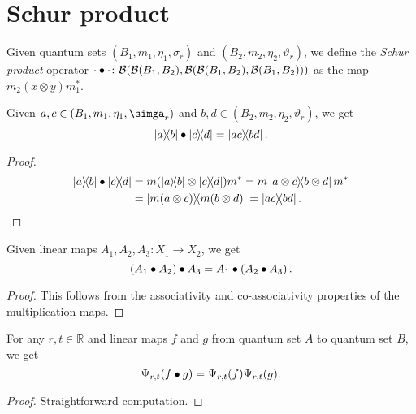 \chapter{Schur product}

 \begin{definition}\label{schurMul}
  \leanok
  Given quantum sets $(B_1,m_1,\eta_1,\sigma_r)$ and $(B_2,m_2,\eta_2,\vartheta_r)$, we define the \textit{Schur product} operator $\cdot\bullet\cdot\colon\mathcal{B}(\mathcal{B}(B_1,B_2),\mathcal{B}(\mathcal{B}(B_1,B_2),\mathcal{B}(B_1,B_2)))$ as the map $m_2(x\otimes y)m_1^*$.
 \end{definition}

 \begin{lemma}\label{schurMul.apply_rankOne}
  \leanok
  Given $a,c\in(B_1,m_1,\eta_1,\simga_r)$ and $b,d\in(B_2,m_2,\eta_2,\vartheta_r)$, we get
  \[\left\lvert a\right\rangle\!\!\left\langle b\right\rvert\bullet\left\lvert c\right\rangle\!\!\left\langle d\right\rvert=\left\lvert ac\right\rangle\!\!\left\langle bd\right\rvert.\]
 \end{lemma}
 \begin{proof}
  \leanok
  \begin{align*}
   \irdN{\ketbra{a}{b}}{\ketbra{c}{d}} &= m(\ketbra{a}{b}\otimes\ketbra{c}{d})m^*
   = m\ketbra{a\otimes c}{b\otimes d}m^*\\
   &= \ketbra{m(a\otimes c)}{m(b\otimes d)}=\ketbra{ac}{bd}.
  \end{align*}
 \end{proof}

 \begin{corollary}\label{schurMul_assoc}
  \leanok
  Given linear maps $A_1,A_2,A_3\colon X_1\to X_2$, we get
  \[\left({A_1}\bullet{A_2}\right)\bullet{A_3}={A_1}\bullet\left({A_2}\bullet{A_3}\right).\]
 \end{corollary}
 \begin{proof}\leanok
  This follows from the associativity and co-associativity properties of the multiplication maps.
 \end{proof}

 \begin{lemma}\label{Psi.schurMul}
  \leanok
  For any $r,t\in\mathbb{R}$ and linear maps $f$ and $g$ from quantum set $A$ to quantum set $B$, we get
  \[\Psi_{r,t}({f}\bullet{g})=\Psi_{r,t}(f)\Psi_{r,t}(g).\]
 \end{lemma}
 \begin{proof}\leanok
  Straightforward computation.
 \end{proof}
